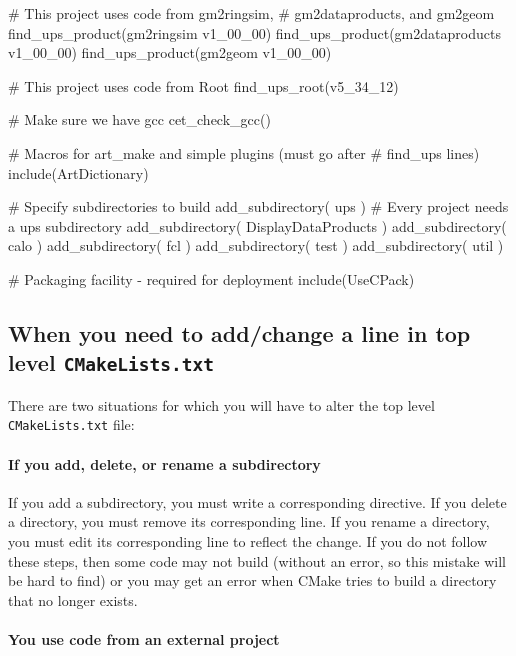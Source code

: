 {\begin{cpplisting}
# This project uses code from gm2ringsim,
# gm2dataproducts, and gm2geom
find_ups_product(gm2ringsim v1_00_00)
find_ups_product(gm2dataproducts v1_00_00)
find_ups_product(gm2geom v1_00_00)

# This project uses code from Root
find_ups_root(v5_34_12)

# Make sure we have gcc
cet_check_gcc()

# Macros for art_make and simple plugins (must go after 
# find_ups lines)
include(ArtDictionary)

# Specify subdirectories to build
add_subdirectory( ups )  # Every project needs a ups subdirectory
add_subdirectory( DisplayDataProducts )
add_subdirectory( calo )
add_subdirectory( fcl )
add_subdirectory( test )
add_subdirectory( util )

# Packaging facility - required for deployment
include(UseCPack)
\end{cpplisting}
}

\subsection{When you need to add/change a line in top level \texttt{CMakeLists.txt}}
\label{sec:changeTopCmakeLists}

There are two situations for which you will have to alter the top level \texttt{CMakeLists.txt} file:

\paragraph{If you add, delete, or rename a subdirectory}

If you add a subdirectory, you must write a corresponding
 directive. If you delete a
directory, you must remove its corresponding
 line. If you rename a directory, you must
edit its corresponding  line to reflect the
change. If you do not follow these steps, then some code may not build
(without an error, so this mistake will be hard to find) or you may
get an error when CMake tries to build a directory that no longer
exists.

\paragraph{You use code from an external project}

